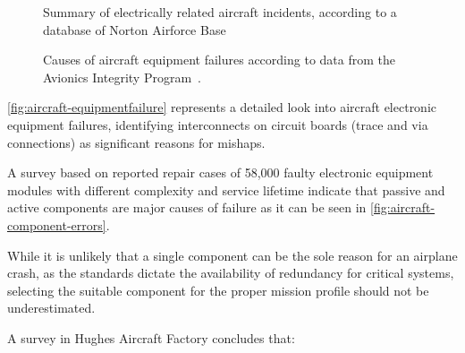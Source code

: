 \begin{figure}[h]
    \centering
    \caption[Summary electrical related aircraft incidents]{Summary of
    electrically related aircraft incidents, according to a database of Norton
    Airforce Base \autocite{norton-mishap}}
    \label{fig:aircraft-incidents}
\end{figure}

\begin{figure}[h]
    \centering
    \caption[Causes of aircraft equipment failure]{Causes of aircraft
    equipment failures according to data from the
    Avionics Integrity Program~\autocite{halpin}.}
    \label{fig:aircraft-equipmentfailure}
\end{figure}

\autoref{fig:aircraft-equipmentfailure} represents a detailed look into aircraft
electronic equipment failures, identifying interconnects on
circuit boards (trace and via connections) as significant reasons for
mishaps\autocite{halpin}.

A survey based on reported repair cases of 58,000 faulty electronic equipment
modules with different complexity and service lifetime indicate that passive
and active components are major causes of failure \autocite{wong1987culprits}
as it can be seen in \autoref{fig:aircraft-component-errors}.

While it is unlikely that a single component can be the sole reason for an
airplane crash, as the standards dictate the availability of redundancy for
critical systems, selecting the suitable component for the proper mission
profile should not be underestimated.

A survey in Hughes Aircraft Factory \autocite{Galler} concludes that:

